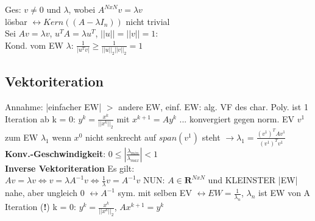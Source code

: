 Ges: $v \neq 0$ und $\lambda$, wobei $A^{NxN}v = \lambda v$\\
lösbar $\leftrightarrow Kern((A-\lambda I_n))$ nicht trivial\\
Sei $Av = \lambda v$, $u^TA = \lambda u^T$, $||u|| = ||v|| = 1$:\\
Kond. vom EW $\lambda$: $\frac{1}{|u^Tv|} \geq \frac{1}{||u||_2||v||_2} = 1$
\subsection{Vektoriteration}
Annahme: |einfacher EW| $>$ andere EW, einf. EW: alg. VF des char. Poly. ist 1\\
Iteration ab k = 0: $y^k = \frac{x^k}{||x^k||_2}$ mit $x^{k+1} = Ay^k$ ... konvergiert gegen norm. EV $v^1$ zum EW $\lambda_1$ wenn $x^0$ nicht senkrecht auf $span(v^1)$ steht $\rightarrow \lambda_1 = \frac{(v^1)^TAv^1}{(v^1)^Tv^1}$\\
\textbf{Konv.-Geschwindigkeit}: $0 \leq |\frac{\lambda_{min}}{\lambda_{max}}| < 1$\\
\textbf{Inverse Vektoriteration} Es gilt:\\ $Av = \lambda v \Leftrightarrow v = \lambda A^{-1}v \Leftrightarrow \frac{1}{\lambda}v = A^{-1}v$
NUN: $A \in \mathbf{R}^{NxN}$ und KLEINSTER |EW| nahe, aber ungleich 0 $\leftrightarrow A^{-1}$ sym. mit selben EV $\leftrightarrow EW = \frac{1}{\lambda_n}$, $\lambda_n$ ist EW von A\\
Iteration (\textbf{!}) k = 0: $y^k = \frac{x^k}{||x^k||_2}$, $Ax^{k+1} = y^k$

